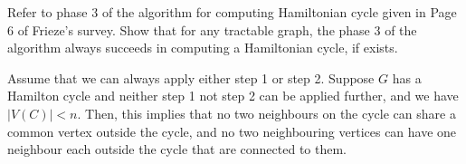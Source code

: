 \documentclass[solution,12pt]{exam}
\begin{document}
\begin{questions}
\question[6] Refer to phase 3 of the algorithm for computing Hamiltonian cycle given in Page 6 of  Frieze's survey.   Show that for any tractable graph, the phase 3 of the algorithm always succeeds in computing a Hamiltonian cycle, if exists. 
\begin{solution}
Assume that we can always apply either step 1 or step 2. Suppose $G$ has a Hamilton cycle and neither step 1 not step 2 can be applied further, and we have $|V(C)| < n$. Then, this implies that no two neighbours on the cycle can share a common vertex outside the cycle, and no two neighbouring vertices can have one neighbour each outside the cycle that are connected to them. 
\end{solution}
 

\end{questions}
\end{document}
